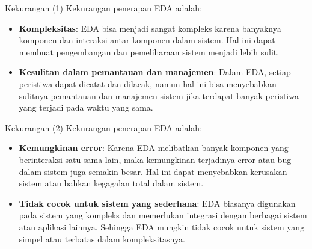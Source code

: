 \documentclass[aspectratio=169, table]{beamer}
\begin{document}
\begin{frame}{Kekurangan (1)}
    Kekurangan penerapan EDA adalah:
    \begin{itemize}
        \item \textbf{Kompleksitas}: EDA bisa menjadi sangat kompleks karena banyaknya komponen dan interaksi antar komponen dalam sistem. Hal ini dapat membuat pengembangan dan pemeliharaan sistem menjadi lebih sulit.
        \item \textbf{Kesulitan dalam pemantauan dan manajemen}: Dalam EDA, setiap peristiwa dapat dicatat dan dilacak, namun hal ini bisa menyebabkan sulitnya pemantauan dan manajemen sistem jika terdapat banyak peristiwa yang terjadi pada waktu yang sama.
    \end{itemize}
\end{frame}

\begin{frame}{Kekurangan (2)}
    Kekurangan penerapan EDA adalah:
    \begin{itemize}
        \item \textbf{Kemungkinan error}: Karena EDA melibatkan banyak komponen yang berinteraksi satu sama lain, maka kemungkinan terjadinya error atau bug dalam sistem juga semakin besar. Hal ini dapat menyebabkan kerusakan sistem atau bahkan kegagalan total dalam sistem.
        \item \textbf{Tidak cocok untuk sistem yang sederhana}: EDA biasanya digunakan pada sistem yang kompleks dan memerlukan integrasi dengan berbagai sistem atau aplikasi lainnya. Sehingga EDA mungkin tidak cocok untuk sistem yang simpel atau terbatas dalam kompleksitasnya.
    \end{itemize}
\end{frame}
\end{document}
